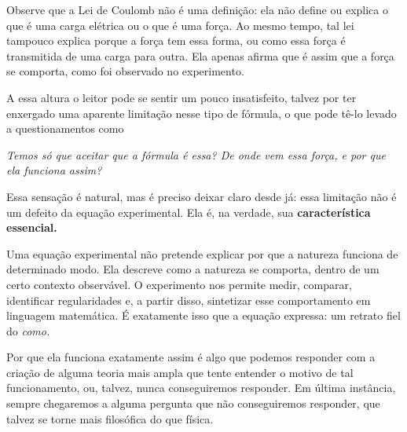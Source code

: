 Observe que a Lei de Coulomb não é uma definição: ela não define ou explica o que é uma carga elétrica ou o que é uma força. Ao mesmo tempo, tal lei tampouco explica porque a força tem essa forma, ou como essa força é transmitida de uma carga para outra. Ela apenas afirma que é assim que a força se comporta, como foi observado no experimento.

A essa altura o leitor pode se sentir um pouco insatisfeito, talvez por ter enxergado uma aparente limitação nesse tipo de fórmula, o que pode tê-lo levado a questionamentos como

\begin{center}
    \textit{Temos só que aceitar que a fórmula é essa? De onde vem essa força, e por que ela funciona assim?}
\end{center}

Essa sensação é natural, mas é preciso deixar claro desde já: essa limitação não é um defeito da equação experimental. Ela é, na verdade, sua \textbf{característica essencial.}

Uma equação experimental não pretende explicar por que a natureza funciona de determinado modo.
Ela descreve como a natureza se comporta, dentro de um certo contexto observável.
O experimento nos permite medir, comparar, identificar regularidades e, a partir disso, sintetizar esse comportamento em linguagem matemática. É exatamente isso que a equação expressa: um retrato fiel do \textit{como.}

Por que ela funciona exatamente assim é algo que podemos responder com a criação de alguma teoria mais ampla que tente entender o motivo de tal funcionamento, ou, talvez, nunca conseguiremos responder. Em última instância, sempre chegaremos a alguma pergunta que não conseguiremos responder, que talvez se torne mais filosófica do que física.


